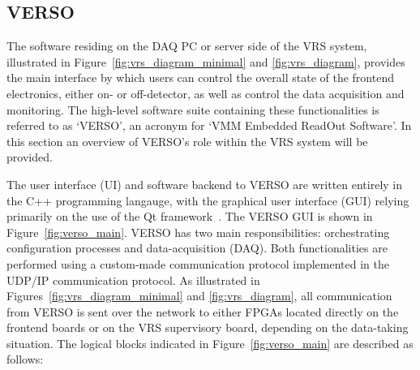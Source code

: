 \subsection{VERSO}
\label{sec:verso}

The software residing on the DAQ PC or server side of the VRS system,
illustrated in Figure~\ref{fig:vrs_diagram_minimal} and \ref{fig:vrs_diagram},
provides the main interface by which users can control the overall
state of the frontend electronics, either on- or off-detector,
as well as control the data acquisition and monitoring.
The high-level software suite containing these functionalities is referred
to as `VERSO', an acronym for `VMM Embedded ReadOut Software'.
In this section an overview of VERSO's role within the VRS system will be provided.

The user interface (UI) and software backend to VERSO are written entirely in the C++ programming langauge,
with the graphical user interface (GUI) relying primarily on the use of the Qt framework~\cite{QtCompany}.
The VERSO GUI is shown in Figure~\ref{fig:verso_main}.
VERSO has two main responsibilities: orchestrating configuration processes and
data-acquisition (DAQ).
Both functionalities are performed using a custom-made communication protocol
implemented in the UDP/IP communication protocol.
As illustrated in Figures~\ref{fig:vrs_diagram_minimal} and \ref{fig:vrs_diagram},
all communication from VERSO is sent over the network to either FPGAs located directly
on the frontend boards or on the VRS supervisory board, depending on the
data-taking situation.
The logical blocks indicated in Figure~\ref{fig:verso_main} are described as follows:

